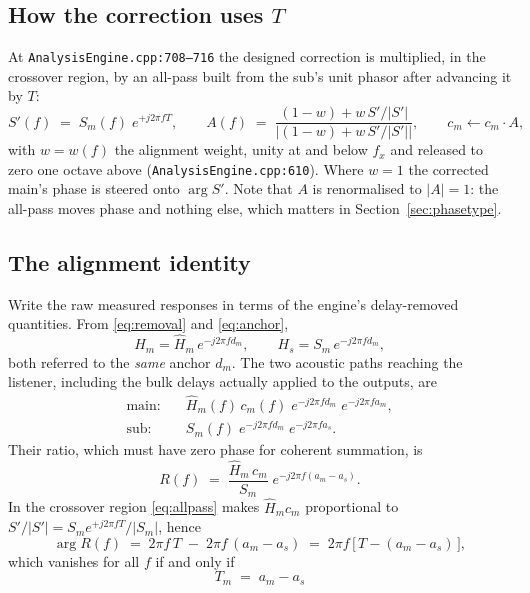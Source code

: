 \documentclass[11pt,a4paper]{article}
\newcommand{\srcref}[2]{\texttt{\small #1}\discretionary{}{}{}\texttt{\small :#2}}
\begin{document}
\subsection{How the correction uses $T$}

At \srcref{AnalysisEngine.cpp}{708--716} the designed correction is multiplied,
in the crossover region, by an all-pass built from the sub's unit phasor after
advancing it by $T$:
%
\begin{equation}
  S'(f) \;=\; S_m(f)\; e^{+j 2\pi f T},
  \qquad
  A(f) \;=\; \frac{(1-w) + w\,S'/|S'|}{\bigl|(1-w) + w\,S'/|S'|\bigr|},
  \qquad
  c_m \leftarrow c_m \cdot A,
  \label{eq:allpass}
\end{equation}
%
with $w = w(f)$ the alignment weight, unity at and below $f_x$ and released to
zero one octave above (\srcref{AnalysisEngine.cpp}{610}). Where $w = 1$ the
corrected main's phase is steered onto $\arg S'$. Note that $A$ is renormalised
to $|A| = 1$: the all-pass moves phase and nothing else, which matters in
Section~\ref{sec:phasetype}.

\subsection{The alignment identity}
\label{sec:identity}

Write the raw measured responses in terms of the engine's delay-removed
quantities. From \eqref{eq:removal} and \eqref{eq:anchor},
%
\begin{equation}
  H_m = \hat H_m\, e^{-j2\pi f d_m},
  \qquad
  H_s = S_m\, e^{-j2\pi f d_m},
\end{equation}
%
both referred to the \emph{same} anchor $d_m$. The two acoustic paths reaching
the listener, including the bulk delays actually applied to the outputs, are
%
\begin{align}
  \text{main:} \quad & \hat H_m(f)\, c_m(f)\; e^{-j2\pi f d_m}\; e^{-j 2\pi f a_m},\\
  \text{sub:}  \quad & S_m(f)\; e^{-j2\pi f d_m}\; e^{-j 2\pi f a_s}.
\end{align}
%
Their ratio, which must have zero phase for coherent summation, is
%
\begin{equation}
  R(f) \;=\; \frac{\hat H_m\, c_m}{S_m}\; e^{-j 2\pi f (a_m - a_s)}.
\end{equation}
%
In the crossover region \eqref{eq:allpass} makes $\hat H_m c_m$ proportional to
$S'/|S'| = S_m e^{+j2\pi f T}/|S_m|$, hence
%
\begin{equation}
  \arg R(f) \;=\; 2\pi f\,T \;-\; 2\pi f\,(a_m - a_s)
             \;=\; 2\pi f\,\bigl[\, T - (a_m - a_s) \,\bigr],
\end{equation}
%
which vanishes for all $f$ if and only if
%
\begin{equation}
  \boxed{\;T_m \;=\; a_m - a_s\;}
  \label{eq:identity}
\end{equation}
\end{document}
